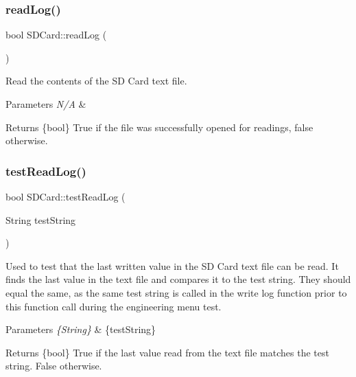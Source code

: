 \subsubsection{\texorpdfstring{read\+Log()}{readLog()}}
{\footnotesize\ttfamily bool S\+D\+Card\+::read\+Log (\begin{DoxyParamCaption}{ }\end{DoxyParamCaption})}

Read the contents of the SD Card text file. 
\begin{DoxyParams}{Parameters}
{\em N/A} & \\
\hline
\end{DoxyParams}
\begin{DoxyReturn}{Returns}
\{bool\} True if the file was successfully opened for readings, false otherwise. 
\end{DoxyReturn}
\mbox{\label{class_s_d_card_ad5832b1d4274a99ca975f4c570584f53}} 
\subsubsection{\texorpdfstring{test\+Read\+Log()}{testReadLog()}}
{\footnotesize\ttfamily bool S\+D\+Card\+::test\+Read\+Log (\begin{DoxyParamCaption}\item[{String}]{test\+String }\end{DoxyParamCaption})}

Used to test that the last written value in the SD Card text file can be read. It finds the last value in the text file and compares it to the test string. They should equal the same, as the same test string is called in the write log function prior to this function call during the engineering menu test. 
\begin{DoxyParams}{Parameters}
{\em \{\+String\}} & \{test\+String\} \\
\hline
\end{DoxyParams}
\begin{DoxyReturn}{Returns}
\{bool\} True if the last value read from the text file matches the test string. False otherwise. 
\end{DoxyReturn}
\mbox{\label{class_s_d_card_aa65251052d32bcaff9f087080118525f}} 
